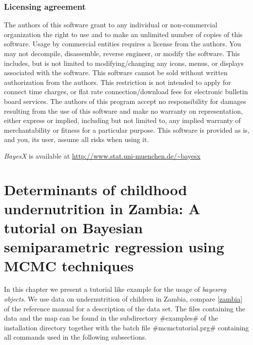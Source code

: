 \documentclass[11pt,a4paper,twoside]{bayesxreport}
\begin{document}
\subsection*{Licensing agreement} The authors of this software grant
to any individual or non-commercial organization the right to use
and to make an unlimited number of copies of this software. Usage by
commercial entities requires a license from the authors. You may not
decompile, disassemble, reverse engineer, or modify the software.
This includes, but is not limited to modifying/changing any icons,
menus, or displays associated with the software. This software
cannot be sold without written authorization from the authors. This
restriction is not intended to apply for connect time charges, or
flat rate connection/download fees for electronic bulletin board
services. The authors of this program accept no responsibility for
damages resulting from the use of this software and make no warranty
on representation, either express or implied, including but not
limited to, any implied warranty of merchantability or fitness for a
particular purpose. This software is provided as is, and you, its
user, assume all risks when using it.

\vspace{0.5cm}

{\em BayesX} is available at {
\href{http://www.stat.uni-muenchen.de/~bayesx}{http://www.stat.uni-muenchen.de/\~{}bayesx}}

\newpage

\chapter[A tutorial
on Bayesian semiparametric regression using MCMC
techniques]{Determinants of childhood undernutrition in Zambia: A
tutorial on Bayesian semiparametric regression using MCMC
techniques} \label{zambiaanalysis}

In this chapter we present a tutorial like example for the usage of
{\em bayesreg objects}. We use data on undernutrition of children in
Zambia, compare \autoref{zambia} of the reference manual for a
description of the data set. The files containing the data and the
map can be found in the subdirectory #examples# of the installation
directory together with the batch file #mcmctutorial.prg# containing
all commands used in the following subsections.
\end{document}
